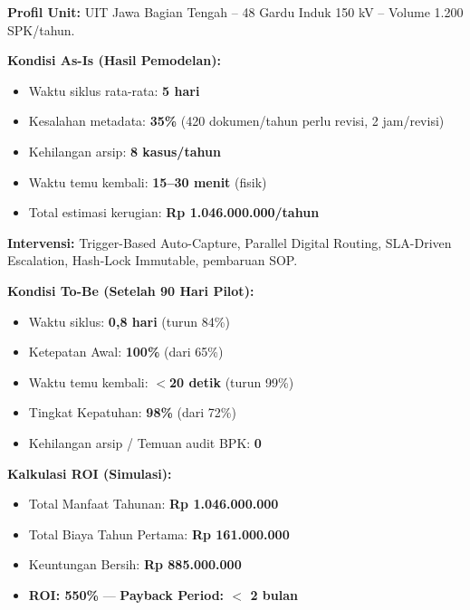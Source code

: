 \documentclass[11pt,a4paper]{article}
\begin{document}
\begin{casebox}
\textbf{Profil Unit:} UIT Jawa Bagian Tengah -- 48 Gardu Induk 150 kV -- Volume 1.200 SPK/tahun.

\vspace{0.3cm}
\textbf{Kondisi As-Is (Hasil Pemodelan):}
\begin{itemize}[nosep]
    \item Waktu siklus rata-rata: \textbf{5 hari}
    \item Kesalahan metadata: \textbf{35\%} (420 dokumen/tahun perlu revisi, 2 jam/revisi)
    \item Kehilangan arsip: \textbf{8 kasus/tahun}
    \item Waktu temu kembali: \textbf{15--30 menit} (fisik)
    \item Total estimasi kerugian: \textbf{Rp 1.046.000.000/tahun}
\end{itemize}

\textbf{Intervensi:} Trigger-Based Auto-Capture, Parallel Digital Routing, SLA-Driven Escalation, Hash-Lock Immutable, pembaruan SOP.

\textbf{Kondisi To-Be (Setelah 90 Hari Pilot):}
\begin{itemize}[nosep]
    \item Waktu siklus: \textbf{0,8 hari} (turun 84\%)
    \item Ketepatan Awal: \textbf{100\%} (dari 65\%)
    \item Waktu temu kembali: \textbf{$<$20 detik} (turun 99\%)
    \item Tingkat Kepatuhan: \textbf{98\%} (dari 72\%)
    \item Kehilangan arsip / Temuan audit BPK: \textbf{0}
\end{itemize}

\textbf{Kalkulasi ROI (Simulasi):}
\begin{itemize}[nosep]
    \item Total Manfaat Tahunan: \textbf{Rp 1.046.000.000}
    \item Total Biaya Tahun Pertama: \textbf{Rp 161.000.000}
    \item Keuntungan Bersih: \textbf{Rp 885.000.000}
    \item \textbf{ROI: 550\%} --- \textbf{Payback Period: $<$ 2 bulan}
\end{itemize}
\end{casebox}
\end{document}
